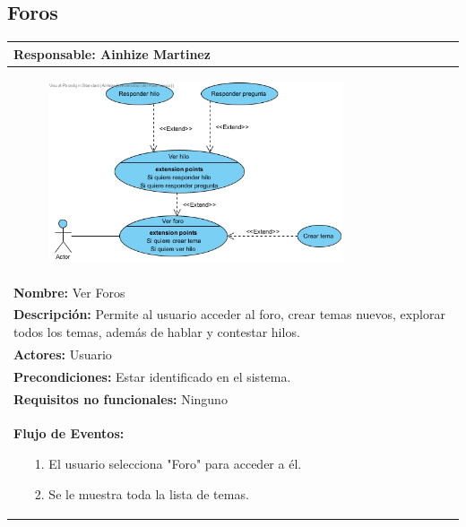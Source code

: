 \documentclass{report}
\begin{document}
            \subsection{Foros}
                \begin{center}
                    \begin{longtable}{|p{\linewidth}|}
                        \hline
                        \textbf{Responsable:} Ainhize Martinez\\
                        \hline
                        \begin{figure}[H]
                            \centering
                            \includegraphics[width=0.8\textwidth]{./img/casos_uso/casos_foro.jpg}
                        \end{figure}\\
                        \hline
                        \textbf{Nombre:} Ver Foros\\
                        \hline
                        \textbf{Descripción:} Permite al usuario acceder al foro, crear temas nuevos, explorar todos los temas, además de hablar y contestar hilos.\\
                        \hline
                        \textbf{Actores:} Usuario\\
                        \hline
                        \textbf{Precondiciones:} Estar identificado en el sistema.\\
                        \hline
                        \textbf{Requisitos no funcionales:} Ninguno\\
                        \hline
                        \textbf{Flujo de Eventos:}
                        \begin{enumerate}
                            \item[1.] El usuario selecciona "Foro" para acceder a él.
                            \item[2.] Se le muestra toda la lista de temas.

\end{enumerate}
\end{longtable}
\end{center}
\end{document}
